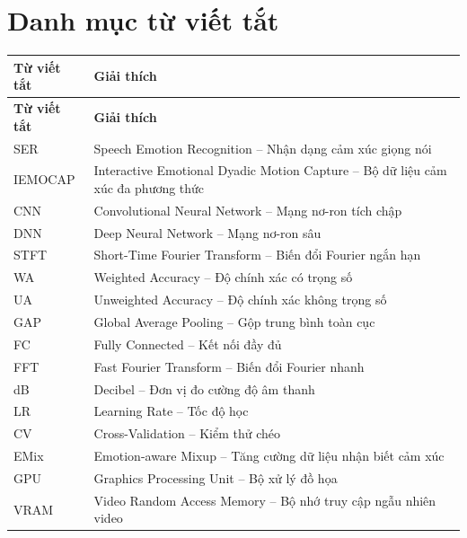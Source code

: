 \chapter*{Danh mục từ viết tắt}

\begin{longtable}{@{}p{3.5cm}p{11cm}@{}}
\toprule
\textbf{Từ viết tắt} & \textbf{Giải thích} \\
\midrule
\endfirsthead
\toprule
\textbf{Từ viết tắt} & \textbf{Giải thích} \\
\midrule
\endhead
SER     & Speech Emotion Recognition -- Nhận dạng cảm xúc giọng nói \\
IEMOCAP & Interactive Emotional Dyadic Motion Capture -- Bộ dữ liệu cảm xúc đa phương thức \\
CNN     & Convolutional Neural Network -- Mạng nơ-ron tích chập \\
DNN     & Deep Neural Network -- Mạng nơ-ron sâu \\
STFT    & Short-Time Fourier Transform -- Biến đổi Fourier ngắn hạn \\
WA      & Weighted Accuracy -- Độ chính xác có trọng số \\
UA      & Unweighted Accuracy -- Độ chính xác không trọng số \\
GAP     & Global Average Pooling -- Gộp trung bình toàn cục \\
FC      & Fully Connected -- Kết nối đầy đủ \\
FFT     & Fast Fourier Transform -- Biến đổi Fourier nhanh \\
dB      & Decibel -- Đơn vị đo cường độ âm thanh \\
LR      & Learning Rate -- Tốc độ học \\
CV      & Cross-Validation -- Kiểm thử chéo \\
EMix    & Emotion-aware Mixup -- Tăng cường dữ liệu nhận biết cảm xúc \\
GPU     & Graphics Processing Unit -- Bộ xử lý đồ họa \\
VRAM    & Video Random Access Memory -- Bộ nhớ truy cập ngẫu nhiên video \\
\bottomrule
\end{longtable}

\newpage
